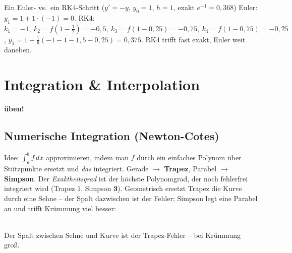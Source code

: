 \documentclass[a4paper,11pt]{article}
\newcommand{\chip}[2]{{\setlength{\fboxsep}{2.5pt}\colorbox{#1}{\color{bgdark}\footnotesize\bfseries #2}}}
\newcommand{\ueben}{\chip{rose}{üben!}}
\begin{document}
\begin{rechnung}{Ein Euler- vs.\ ein RK4-Schritt ($y'=-y$, $y_0=1$, $h=1$, exakt $e^{-1}=0{,}368$)}
Euler: $y_1=1+1\cdot(-1)=0$. \quad RK4: $k_1{=}-1,\ k_2{=}f(1{-}\tfrac12){=}-0{,}5,\
k_3{=}f(1{-}0{,}25){=}-0{,}75,\ k_4{=}f(1{-}0{,}75){=}-0{,}25$,
$y_1=1+\tfrac16(-1-1-1{,}5-0{,}25)=0{,}375$. RK4 trifft fast exakt, Euler weit daneben.
\end{rechnung}

\section{Integration \& Interpolation}
\ueben

\subsection{Numerische Integration (Newton-Cotes)}
Idee: $\int_a^b f\,dx$ approximieren, indem man $f$ durch ein einfaches Polynom über Stützpunkte
ersetzt und \emph{das} integriert. Gerade $\to$ \textbf{Trapez}, Parabel $\to$ \textbf{Simpson}. Der
\emph{Exaktheitsgrad} ist der höchste Polynomgrad, der noch fehlerfrei integriert wird (Trapez $1$,
Simpson $\mathbf 3$). Geometrisch ersetzt Trapez die Kurve durch eine Sehne -- der Spalt dazwischen
ist der Fehler; Simpson legt eine Parabel an und trifft Krümmung viel besser:

\begin{center}
\\[-2pt]
{\footnotesize\color{muted}Der Spalt zwischen Sehne und Kurve ist der Trapez-Fehler -- bei Krümmung groß.}
\end{center}
\end{document}
